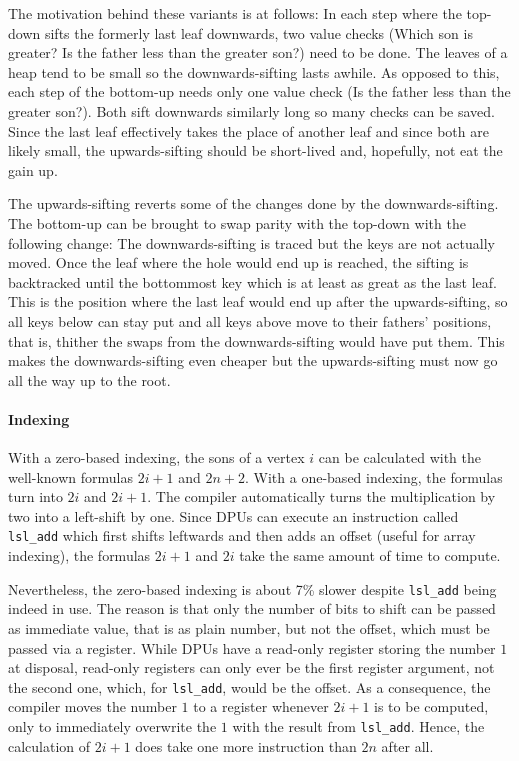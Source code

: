 The motivation behind these variants is at follows:
In each step where the top-down \HS{} sifts the formerly last leaf downwards, two value checks (Which son is greater? Is the father less than the greater son?) need to be done.
The leaves of a heap tend to be small so the downwards-sifting lasts awhile.
As opposed to this, each step of the bottom-up \HS{} needs only one value check (Is the father less than the greater son?).
Both \HS*{} sift downwards similarly long so many checks can be saved.
Since the last leaf effectively takes the place of another leaf and since both are likely small, the upwards-sifting should be short-lived and, hopefully, not eat the gain up.

The upwards-sifting reverts some of the changes done by the downwards-sifting.
The bottom-up \HS{} can be brought to swap parity with the top-down \HS{} with the following change:
The downwards-sifting is traced but the keys are not actually moved.
Once the leaf where the hole would end up is reached, the sifting is backtracked until the bottommost key which is at least as great as the last leaf.
This is the position where the last leaf would end up after the upwards-sifting, so all keys below can stay put and all keys above move to their fathers' positions, that is, thither the swaps from the downwards-sifting would have put them.
This makes the downwards-sifting even cheaper but the upwards-sifting must now go all the way up to the root.

\paragraph{Indexing}
With a zero-based indexing, the sons of a vertex \(i\) can be calculated with the well-known formulas \(2i + 1\) and \(2n + 2\).
With a one-based indexing, the formulas turn into \(2i\) and \(2i + 1\).
The compiler automatically turns the multiplication by two into a left-shift by one.
Since DPUs can execute an instruction called \lstinline|lsl_add| which first shifts leftwards and then adds an offset (useful \eg{} for array indexing), the formulas \(2i + 1\) and \(2i\) take the same amount of time to compute.

Nevertheless, the zero-based indexing is about 7\% slower despite \lstinline|lsl_add| being indeed in use.
The reason is that only the number of bits to shift can be passed as immediate value, that is as plain number, but not the offset, which must be passed via a register.
While DPUs have a read-only register storing the number \(1\) at disposal, read-only registers can only ever be the first register argument, not the second one, which, for \lstinline|lsl_add|, would be the offset.
As a consequence, the compiler moves the number \(1\) to a register whenever \(2i + 1\) is to be computed, only to immediately overwrite the \(1\) with the result from \lstinline|lsl_add|.
Hence, the calculation of \(2i + 1\) does take one more instruction than \(2n\) after all.

